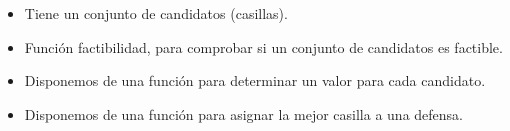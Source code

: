 \begin{itemize}
    \item Tiene un conjunto de candidatos (casillas).
    \item Función factibilidad, para comprobar si un conjunto de candidatos es factible. 
    \item Disponemos de una función para determinar un valor para cada candidato.
    \item Disponemos de una función para asignar la mejor casilla a una defensa.
\end{itemize}
  